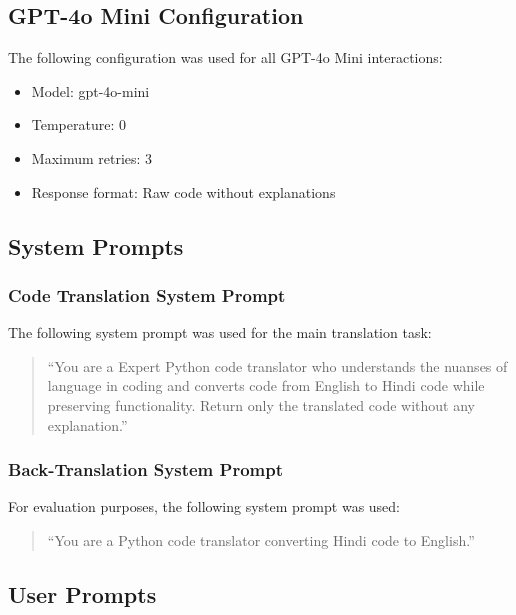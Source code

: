 \documentclass[11pt,a4paper]{article}
\begin{document}
\subsection{GPT-4o Mini Configuration}
The following configuration was used for all GPT-4o Mini interactions:

\begin{itemize}
    \item Model: gpt-4o-mini
    \item Temperature: 0
    \item Maximum retries: 3
    \item Response format: Raw code without explanations
\end{itemize}

\subsection{System Prompts}
\subsubsection{Code Translation System Prompt}
The following system prompt was used for the main translation task:
\begin{quote}
``You are a Expert Python code translator who understands the nuanses of language in coding and converts code from English to Hindi code while preserving functionality. Return only the translated code without any explanation.''
\end{quote}

\subsubsection{Back-Translation System Prompt}
For evaluation purposes, the following system prompt was used:
\begin{quote}
``You are a Python code translator converting Hindi code to English.''
\end{quote}

\subsection{User Prompts}
\end{document}
